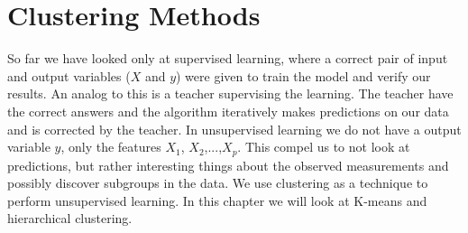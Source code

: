 \chapter{Clustering Methods} \label{ch:clusteringMethods}
So far we have looked only at supervised learning, where a correct pair of input and output variables ($X$ and $y$) were given to train the model and verify our results. An analog to this is a teacher supervising the learning. The teacher have the correct answers and the algorithm iteratively makes predictions on our data and is corrected by the teacher. In unsupervised learning we do not have a output variable $y$, only the features $X_1$, $X_2$,...,$X_p$. This compel us to not look at predictions, but rather interesting things about the observed measurements and possibly discover subgroups in the data. We use clustering as a technique to perform unsupervised learning. In this chapter we will look at K-means and hierarchical clustering.



